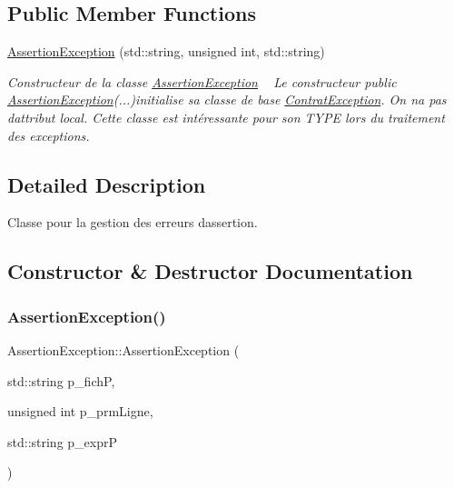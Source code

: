 \subsection*{Public Member Functions}
\begin{DoxyCompactItemize}
\item 
\hyperlink{classAssertionException_a93268f249b033bf4596901e50874fde6}{Assertion\+Exception} (std\+::string, unsigned int, std\+::string)
\begin{DoxyCompactList}\small\item\em Constructeur de la classe \hyperlink{classAssertionException}{Assertion\+Exception} ~\newline
 Le constructeur public \hyperlink{classAssertionException}{Assertion\+Exception}(...)initialise sa classe de base \hyperlink{classContratException}{Contrat\+Exception}. On n\textquotesingle{}a pas d\textquotesingle{}attribut local. Cette classe est intéressante pour son T\+Y\+PE lors du traitement des exceptions. \end{DoxyCompactList}\end{DoxyCompactItemize}


\subsection{Detailed Description}
Classe pour la gestion des erreurs d\textquotesingle{}assertion. 

\subsection{Constructor \& Destructor Documentation}
\mbox{\label{classAssertionException_a93268f249b033bf4596901e50874fde6}} 
\subsubsection{\texorpdfstring{Assertion\+Exception()}{AssertionException()}}
{\footnotesize\ttfamily Assertion\+Exception\+::\+Assertion\+Exception (\begin{DoxyParamCaption}\item[{std\+::string}]{p\+\_\+fichP,  }\item[{unsigned int}]{p\+\_\+prm\+Ligne,  }\item[{std\+::string}]{p\+\_\+exprP }\end{DoxyParamCaption})}




